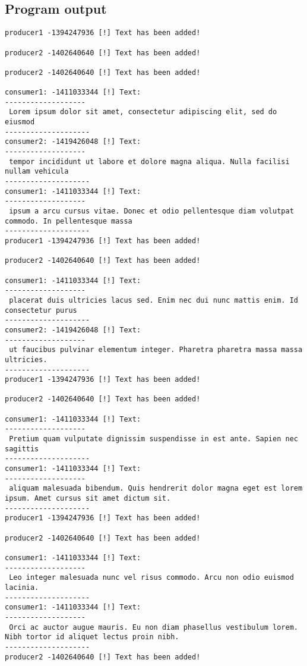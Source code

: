 \documentclass{article}
\begin{document}
\subsection{Program output}
\normalsize
\begin{lstlisting}[]
producer1 -1394247936 [!] Text has been added! 

producer2 -1402640640 [!] Text has been added! 

producer2 -1402640640 [!] Text has been added! 

consumer1: -1411033344 [!] Text: 
-------------------
 Lorem ipsum dolor sit amet, consectetur adipiscing elit, sed do eiusmod 
--------------------
consumer2: -1419426048 [!] Text: 
-------------------
 tempor incididunt ut labore et dolore magna aliqua. Nulla facilisi nullam vehicula 
--------------------
consumer1: -1411033344 [!] Text: 
-------------------
 ipsum a arcu cursus vitae. Donec et odio pellentesque diam volutpat commodo. In pellentesque massa
--------------------
producer1 -1394247936 [!] Text has been added! 

producer2 -1402640640 [!] Text has been added! 

consumer1: -1411033344 [!] Text: 
-------------------
 placerat duis ultricies lacus sed. Enim nec dui nunc mattis enim. Id consectetur purus
--------------------
consumer2: -1419426048 [!] Text: 
-------------------
 ut faucibus pulvinar elementum integer. Pharetra pharetra massa massa ultricies.
--------------------
producer1 -1394247936 [!] Text has been added! 

producer2 -1402640640 [!] Text has been added! 

consumer1: -1411033344 [!] Text: 
-------------------
 Pretium quam vulputate dignissim suspendisse in est ante. Sapien nec sagittis
--------------------
consumer1: -1411033344 [!] Text: 
-------------------
 aliquam malesuada bibendum. Quis hendrerit dolor magna eget est lorem ipsum. Amet cursus sit amet dictum sit.
--------------------
producer1 -1394247936 [!] Text has been added! 

producer2 -1402640640 [!] Text has been added! 

consumer1: -1411033344 [!] Text: 
-------------------
 Leo integer malesuada nunc vel risus commodo. Arcu non odio euismod lacinia. 
--------------------
consumer1: -1411033344 [!] Text: 
-------------------
 Orci ac auctor augue mauris. Eu non diam phasellus vestibulum lorem. Nibh tortor id aliquet lectus proin nibh.
--------------------
producer2 -1402640640 [!] Text has been added! 


\end{lstlisting}
\end{document}
